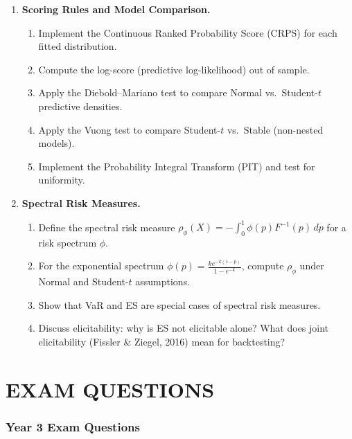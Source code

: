 \documentclass[11pt, a4paper]{article}
\theoremstyle{definition}
\begin{document}
\begin{enumerate}[label=\textbf{P\arabic*.}]
\item \textbf{Scoring Rules and Model Comparison.}
\begin{enumerate}[label=(\alph*)]
  \item Implement the Continuous Ranked Probability Score (CRPS) for each fitted distribution.
  \item Compute the log-score (predictive log-likelihood) out of sample.
  \item Apply the Diebold--Mariano test to compare Normal vs.\ Student-$t$ predictive densities.
  \item Apply the Vuong test to compare Student-$t$ vs.\ Stable (non-nested models).
  \item Implement the Probability Integral Transform (PIT) and test for uniformity.
\end{enumerate}

\item \textbf{Spectral Risk Measures.}
\begin{enumerate}[label=(\alph*)]
  \item Define the spectral risk measure $\rho_\phi(X) = -\int_0^1 \phi(p)F^{-1}(p)\,dp$ for a risk spectrum $\phi$.
  \item For the exponential spectrum $\phi(p) = \frac{ke^{-k(1-p)}}{1-e^{-k}}$, compute $\rho_\phi$ under Normal and Student-$t$ assumptions.
  \item Show that VaR and ES are special cases of spectral risk measures.
  \item Discuss elicitability: why is ES not elicitable alone? What does joint elicitability (Fissler \& Ziegel, 2016) mean for backtesting?
\end{enumerate}

\end{enumerate}


\part{EXAM QUESTIONS}

\section{Year 3 Exam Questions}
\end{document}
